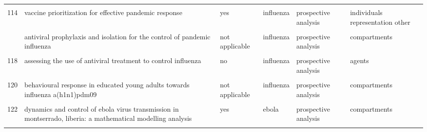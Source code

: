 \documentclass[
]{article}
\begin{document}
\begin{landscape}
\begin{longtable}{l>{\raggedright\arraybackslash}p{3.3cm}l>{\raggedright\arraybackslash}p{3.3cm}>{\raggedright\arraybackslash}p{2cm}l}
\cellcolor{gray!6}{113} & \cellcolor{gray!6}{treatment–donation-stockpile dynamics in ebola convalescent blood transfusion therapy} & \cellcolor{gray!6}{no} & \cellcolor{gray!6}{ebola} & \cellcolor{gray!6}{prospective analysis} & \cellcolor{gray!6}{compartments}\\
114 & vaccine prioritization for effective pandemic response & yes & influenza & prospective analysis & individuals representation other\\
\cellcolor{gray!6}{115} & \cellcolor{gray!6}{a mathematical study of a tb model with treatment interruptions and two latent periods} & \cellcolor{gray!6}{not applicable} & \cellcolor{gray!6}{tuberculosis} & \cellcolor{gray!6}{prospective analysis} & \cellcolor{gray!6}{compartments}\\
\addlinespace
116 & antiviral prophylaxis and isolation for the control of pandemic influenza & not applicable & influenza & prospective analysis & compartments\\
\cellcolor{gray!6}{117} & \cellcolor{gray!6}{assessing the impact of travel restrictions on international spread of the 2014 west african ebola epidemic} & \cellcolor{gray!6}{not applicable} & \cellcolor{gray!6}{ebola} & \cellcolor{gray!6}{prospective analysis} & \cellcolor{gray!6}{compartments}\\
118 & assessing the use of antiviral treatment to control influenza & no & influenza & prospective analysis & agents\\
\cellcolor{gray!6}{119} & \cellcolor{gray!6}{behavior in the time of cholera: evidence from the 2008-2009 cholera outbreak in zimbabwe} & \cellcolor{gray!6}{no} & \cellcolor{gray!6}{cholera} & \cellcolor{gray!6}{prospective analysis} & \cellcolor{gray!6}{compartments}\\
120 & behavioural response in educated young adults towards influenza a(h1n1)pdm09 & not applicable & influenza & prospective analysis & compartments\\
\addlinespace
\cellcolor{gray!6}{121} & \cellcolor{gray!6}{cover your cough! quantifying the benefits of a localized healthy behavior intervention on flu epidemics in washington dc} & \cellcolor{gray!6}{yes} & \cellcolor{gray!6}{influenza} & \cellcolor{gray!6}{retrospective analysis} & \cellcolor{gray!6}{compartments}\\
122 & dynamics and control of ebola virus transmission in montserrado, liberia: a mathematical modelling analysis & yes & ebola & prospective analysis & compartments\\
\cellcolor{gray!6}{123} & \cellcolor{gray!6}{estimating the effectiveness of early control measures through school absenteeism surveillance in observed outbreaks at rural schools in hubei, china} & \cellcolor{gray!6}{yes} & \cellcolor{gray!6}{influenza mumps varicella} & \cellcolor{gray!6}{retrospective analysis} & \cellcolor{gray!6}{compartments}\\

\end{longtable}
\end{landscape}
\end{document}
